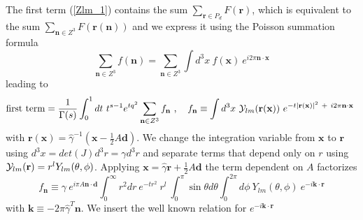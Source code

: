 \documentclass[a4paper,12pt]{book}
\begin{document}
The first term (\ref{Zlm_1}) contains the sum $\sum_{\mathbf{r} \in P_d}F(\mathbf{r})$, which is equivalent to the sum $\sum_{\mathbf{n}\in Z^3} F(\mathbf{r}(\mathbf{n}))$ and we express  it  using the Poisson summation formula  
\begin{equation}
\label{poisson}
\sum_{\mathbf{n}\in Z^3} f(\mathbf{n})=\sum_{\mathbf{n}\in Z^3} \int d^3x~f(\mathbf{x})~e^{i2\pi \mathbf{n}\cdot \mathbf{x}}
\end{equation}
leading to
\begin{equation}
\label{first_term}
\mathrm{first\ term}=\frac{1}{\Gamma(s)} \int _0^1 dt~t^{s-1} e^{tq^2} \sum_{\mathbf{n}\in Z^3} f_{\mathbf{n}}~,\quad f_{\mathbf{n}}\equiv \int d^3x~{\cal Y}_{lm}(\mathbf{r}(\mathbf{x}))~ e^{-t|\mathbf{r}(\mathbf{x})|^2~+~i2\pi \mathbf{n}\cdot \mathbf{x}} \ 
\end{equation}
with $\mathbf{r}(\mathbf{x})=\hat \gamma^{-1}(\mathbf{x}-\tfrac{1}{2}A\mathbf{d})$. We change the integration variable  from $\mathbf{x}$ to $\mathbf{r}$ using $d^3x=det(J)d^3r=\gamma d^3r$ and separate terms that depend only on $r$  using ${\cal Y}_{lm}(\mathbf{r})= r^l Y_{lm}(\theta,\phi)$.  Applying  $\mathbf{x}=\hat \gamma \mathbf{r}+\tfrac{1}{2}A\mathbf{d}$ the term dependent on $A$ factorizes 
\begin{equation}
\label{f}
f_{\mathbf{n}}\equiv \gamma~ e^{i\pi A \mathbf{n\cdot d}}  \int_0^\infty r^2 dr ~ e^{-tr^2} ~r^l~\int_0^\pi \sin\theta d\theta\int_0^{2\pi} d\phi~ Y_{lm}(\theta,\phi)~e^{-i\mathbf{k}\cdot \mathbf{r}}   
\end{equation}
with $\mathbf{k}\equiv -2\pi \hat \gamma^T \mathbf{n}$. We insert the well known relation for $e^{-i\mathbf{k}\cdot \mathbf{r}}$ 
\end{document}

